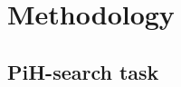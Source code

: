 \documentclass[final,5p,times,twocolumn]{elsarticle}
\begin{document}


\section{Methodology}\label{sec:experiment_methods}

\subsection{PiH-search task}
\end{document}

